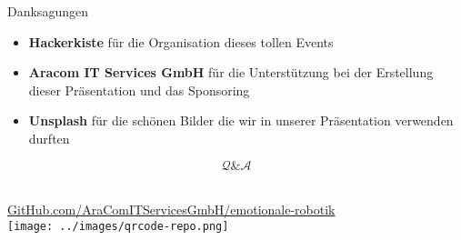 \documentclass[aspectratio=169]{beamer}
\begin{document}
\begin{frame}{Danksagungen}
  \begin{itemize}
    \item \textbf{Hackerkiste} für die Organisation dieses tollen Events
    \item \textbf{Aracom IT Services GmbH} für die Unterstützung bei der Erstellung dieser Präsentation und das Sponsoring
    \item \textbf{Unsplash} für die schönen Bilder die wir in unserer Präsentation verwenden durften
  \end{itemize}
\end{frame}

\begin{frame}[c]{}
  \centering
  \begin{minipage}{\textwidth}
    \centering
    \Huge \[\mathcal Q \& \mathcal A\]
    \Large {}
  \end{minipage}
\end{frame}

\begin{frame}[c]{}
  \centering
  \begin{minipage}{\textwidth}
    \centering
    \Large {}\\
    \href{https://github.com/AraComITServicesGmbH/emotionale-robotik}{GitHub.com/AraComITServicesGmbH/emotionale-robotik}\\
    \vspace{.4cm}
    \texttt{[image: ../images/qrcode-repo.png]}
  \end{minipage}
\end{frame}
\end{document}
